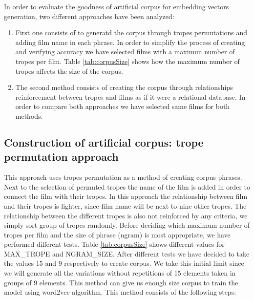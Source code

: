 \documentclass[letterpaper]{article}
\begin{document}
	In order to evaluate the goodness of artificial corpus for embedding vectors generation, two different approaches have been analyzed:
	\begin{enumerate}
		\item First one consists of to generatd the corpus through tropes permutations and adding film name in each phrase. In order to simplify the process of creating and verifying accuracy we have selected films with a maximun number of tropes per film. Table \ref{tab:corpusSize} shows how the maximum number of tropes affects the size of the corpus.
		
        \item The second method consists of creating the corpus through relationships reinforcement between tropes and films as if it were a relational database. In order to compare both approaches we have selected same films for both methods.
	 \end{enumerate}
 
    \subsection{Construction of artificial corpus: trope permutation approach}
    
    This approach uses tropes permutation as a method of creating corpus phrases. Next to the selection of permuted tropes the name of the film is added in order to connect the film with their tropes. In this approach the relationship between film and their tropes is lighter, since film name will be next to nine other tropes. The relationship between the different tropes is also not reinforced by any criteria, we simply sort group of tropes randomly. Before deciding which maximum number of tropes per film and the size of phrase (ngram) is most appropriate, we have performed different tests. Table \ref{tab:corpusSize} shows different values for MAX\_TROPE and NGRAM\_SIZE. After different tests we have decided to take the values 15 and 9 respectively to create corpus. We take this
    initial limit since we will generate all the variations
    without repetitions of 15 elements taken in groups of 9
    elements. This method can give us enough size corpus to train
    the model using word2vec algorithm. This method consists of the following steps:
	
\end{document}
